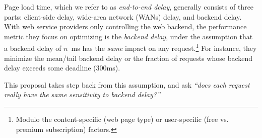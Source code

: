 Page load time, which we refer to as {\em end-to-end delay}, generally consists of three parts: client-side delay, wide-area network (WANs) delay, and backend delay.
With web service providers only controlling the web backend, the performance metric they focus on optimizing is the 
{\em backend delay}, under the assumption that a backend delay of $n$~ms has the {\em same} impact on any request.\footnote{Modulo the content-specific (\eg web page type) or user-specific (\eg free vs. premium subscription) factors.}
For instance, they minimize the mean/tail backend delay or the fraction of requests whose backend delay exceeds some deadline (\eg 300ms).

This proposal takes step back from this assumption, and ask {\em ``does each request really have the same sensitivity to backend delay?''}

